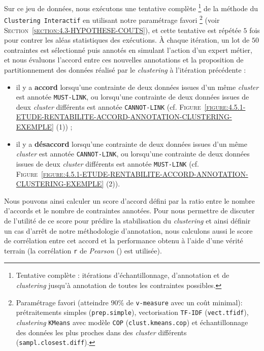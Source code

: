 			Sur ce jeu de données, nous exécutons une tentative complète \footnote{
				Tentative complète : itérations d'échantillonnage, d'annotation et de \textit{clustering} jusqu'à annotation de toutes les contraintes possibles.
			}
			de la méthode du \texttt{Clustering Interactif} en utilisant notre paramétrage favori \footnote{
				Paramétrage favori (atteindre $90$\% de \texttt{v-measure} avec un coût minimal): prétraitements simples (\texttt{prep.simple}), vectorisation \texttt{TF-IDF} (\texttt{vect.tfidf}), \textit{clustering} \texttt{KMeans} avec modèle \texttt{COP} (\texttt{clust.kmeans.cop}) et échantillonnage des données les plus proches dans des \textit{cluster} différents (\texttt{sampl.closest.diff}).
			} (voir \textsc{Section~\ref{section:4.3-HYPOTHESE-COUTS}}), et cette tentative est répétée $5$ fois pour contrer les aléas statistiques des exécutions.
			À chaque itération, un lot de $50$ contraintes est sélectionné puis annotés en simulant l'action d'un expert métier, et nous évaluons l'accord entre ces nouvelles annotations et la proposition de partitionnement des données réalisé par le \textit{clustering} à l'itération précédente :
			\begin{itemize}
				\item il y a \textbf{accord} lorsqu'une contrainte de deux données issues d'un même \textit{cluster} est annotée \texttt{MUST-LINK}, ou lorsqu'une contrainte de deux données issues de deux \textit{cluster} différents est annotée \texttt{CANNOT-LINK} (cf. \textsc{Figure~\ref{figure:4.5.1-ETUDE-RENTABILITE-ACCORD-ANNOTATION-CLUSTERING-EXEMPLE} (1)}) ;
				\item il y a \textbf{désaccord} lorsqu'une contrainte de deux données issues d'un même \textit{cluster} est annotée \texttt{CANNOT-LINK}, ou lorsqu'une contrainte de deux données issues de deux \textit{cluster} différents est annotée \texttt{MUST-LINK} (cf. \textsc{Figure~\ref{figure:4.5.1-ETUDE-RENTABILITE-ACCORD-ANNOTATION-CLUSTERING-EXEMPLE} (2)}).
			\end{itemize}
			Nous pouvons ainsi calculer un score d'accord défini par la ratio entre le nombre d'accords et le nombre de contraintes annotées.
			Pour nous permettre de discuter de l'utilité de ce score pour prédire la stabilisation du \textit{clustering} et ainsi définir un cas d'arrêt de notre méthodologie d'annotation, nous calculons aussi le score de corrélation entre cet accord et la performance obtenu à l'aide d'une vérité terrain (la corrélation \texttt{r} de \textit{Pearson} (\cite{kirch:2008:pearson-correlation-coefficient}) est utilisée).

